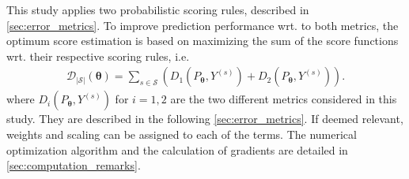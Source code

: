 \documentclass{article}
\DeclareMathOperator*{\argmax}{arg\,max}
\begin{document}
This study applies two probabilistic scoring rules, described in \cref{sec:error_metrics}. To improve prediction performance wrt. to both metrics, the optimum score estimation is based on maximizing the sum of the score functions wrt. their respective scoring rules, i.e.
\begin{align}
     \mathcal{D}_{{|\mathcal{S}|}}(\bm{\theta}) = \sum_{s \in \mathcal{S}} \left( D_1\left(P_{\bm{\theta}}, Y^{(s)}\right) + D_2\left(P_{\bm{\theta}}, Y^{(s)}\right) \right). \label{eq:mean_score_combination}
\end{align}
where $D_i(P_{\bm{\theta}}, Y^{(s)})$ for $i = 1,2$ are the two different metrics considered in this study. They are described in the following \cref{sec:error_metrics}. If deemed relevant, weights and scaling can be assigned to each of the terms. 
The numerical optimization algorithm and the calculation of gradients are detailed in \cref{sec:computation_remarks}.









\end{document}
